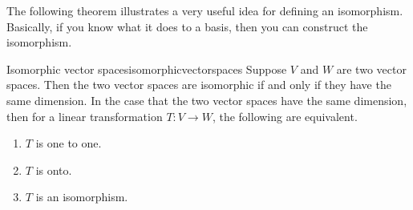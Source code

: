 The following theorem illustrates a very useful idea for defining an
isomorphism. Basically, if you know what it does to a basis, then you can
construct the isomorphism.

\begin{theorem}{Isomorphic vector spaces}{isomorphicvectorspaces}
Suppose $V$ and $W$ are two vector spaces. Then the two vector spaces are isomorphic if and only
if they have the same dimension. In the case that the two vector spaces have
the same dimension, then for
 a linear transformation $T:V\rightarrow W$, the
following are equivalent.

\begin{enumerate}
\item $T$ is one to one.

\item $T$ is onto.

\item $T$ is an isomorphism.
\end{enumerate}
\end{theorem}

